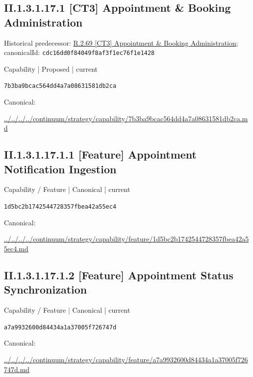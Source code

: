 \documentclass[10pt,a4paper]{article}
\begin{document}
\subsection*{II.1.3.1.17.1 [CT3] Appointment \& Booking Administration}
Historical predecessor: \hyperref[element-cdc16dd0f84049f8af3f1ec76f1e1428]{R.2.69 [CT3] Appointment \& Booking Administration}; canonicalId: \texttt{cdc16dd0f84049f8af3f1ec76f1e1428}\par
\label{element-7b3ba9bcac564dd4a7a08631581db2ca}
{\small Capability | Proposed | current}\par
\texttt{7b3ba9bcac564dd4a7a08631581db2ca}\par
Canonical: \par
{\footnotesize\url{../../../../continuum/strategy/capability/7b3ba9bcac564dd4a7a08631581db2ca.md}}\par
\subsection*{II.1.3.1.17.1.1 [Feature] Appointment Notification Ingestion}
\label{element-1d5bc2b1742544728357fbea42a55ec4}
{\small Capability / Feature | Canonical | current}\par
\texttt{1d5bc2b1742544728357fbea42a55ec4}\par
Canonical: \par
{\footnotesize\url{../../../../continuum/strategy/capability/feature/1d5bc2b1742544728357fbea42a55ec4.md}}\par
\subsection*{II.1.3.1.17.1.2 [Feature] Appointment Status Synchronization}
\label{element-a7a9932600d84434a1a37005f726747d}
{\small Capability / Feature | Canonical | current}\par
\texttt{a7a9932600d84434a1a37005f726747d}\par
Canonical: \par
{\footnotesize\url{../../../../continuum/strategy/capability/feature/a7a9932600d84434a1a37005f726747d.md}}\par
\end{document}
